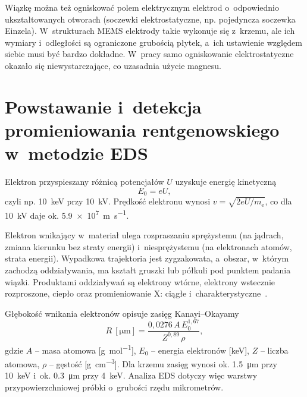 Wiązkę można też ogniskować polem elektrycznym elektrod o~odpowiednio
ukształtowanych otworach (soczewki elektrostatyczne, np. pojedyncza
soczewka Einzela). W~strukturach MEMS elektrody takie wykonuje się
z~krzemu, ale ich wymiary i~odległości są ograniczone grubością płytek,
a~ich ustawienie względem siebie musi być bardzo dokładne. W~pracy
\cite{urbanski2026phd} samo ogniskowanie elektrostatyczne okazało się
niewystarczające, co uzasadnia użycie magnesu.

\section{Powstawanie i~detekcja promieniowania rentgenowskiego w~metodzie EDS}
\label{sec:rtg}
\label{sec:spektrometria}

\begin{przeniesione}
Elektron przyspieszany różnicą potencjałów $U$ uzyskuje energię
kinetyczną
\begin{equation}
  E_0 = eU,
\end{equation}
czyli np. \SI{10}{\kilo\electronvolt} przy \SI{10}{\kilo\volt}. Prędkość
elektronu wynosi $v=\sqrt{2eU/m_\mathrm{e}}$, co dla \SI{10}{\kilo\volt} daje
ok. \SI{5.9e7}{\metre\per\second}.
\end{przeniesione}
Elektron wnikający w~materiał ulega rozpraszaniu sprężystemu (na
jądrach, zmiana kierunku bez straty energii) i~niesprężystemu (na
elektronach atomów, strata energii). Wypadkowa trajektoria jest
zygzakowata, a~obszar, w~którym zachodzą oddziaływania, ma kształt
gruszki lub półkuli pod punktem padania wiązki. Produktami oddziaływań
są elektrony wtórne, elektrony wstecznie rozproszone, ciepło oraz
promieniowanie X: ciągłe 
i~charakterystyczne~\cite{goldstein2018sem}.

Głębokość wnikania elektronów opisuje zasięg Kanayi--Okayamy
\begin{equation}
  R~[\si{\micro\metre}] = \frac{0{,}0276\,A\,E_0^{1{,}67}}{Z^{0{,}89}\,\rho},
\end{equation}
gdzie $A$ -- masa atomowa [\si{\gram\per\mole}], $E_0$ -- energia elektronów [\si{\kilo\electronvolt}],
$Z$ -- liczba atomowa, $\rho$ -- gęstość [\si{\gram\per\centi\metre\cubed}]. Dla krzemu zasięg
wynosi ok. \SI{1.5}{\micro\metre} przy \SI{10}{\kilo\electronvolt}
i~ok. \SI{0.3}{\micro\metre} przy \SI{4}{\kilo\electronvolt}.
Analiza EDS dotyczy więc warstwy przypowierzchniowej próbki o~grubości
rzędu mikrometrów.

